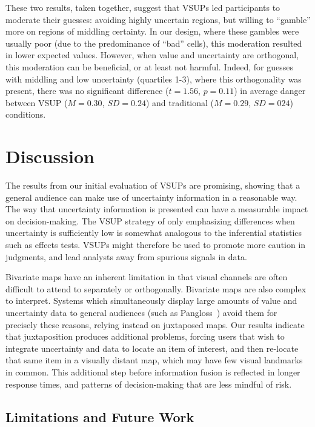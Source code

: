 These two results, taken together, suggest that VSUPs led participants to moderate their guesses: avoiding highly uncertain regions, but willing to ``gamble'' more on regions of middling certainty. In our design, where these gambles were usually poor (due to the predominance of ``bad'' cells), this moderation resulted in lower expected values. However, when value and uncertainty are orthogonal, this moderation can be beneficial, or at least not harmful. Indeed, for guesses with middling and low uncertainty (quartiles 1-3), where this orthogonality was present, there was no significant difference ($t=1.56$, $p=0.11$) in average danger between VSUP ($M=0.30$, $SD=0.24$) and traditional ($M=0.29$, $SD=024$) conditions. 

\section{Discussion}

\sizeFig

The results from our initial evaluation of VSUPs are promising, showing that a general audience can make use of uncertainty information in a reasonable way. The way that uncertainty information is presented can have a measurable impact on decision-making. The VSUP strategy of only emphasizing differences when uncertainty is sufficiently low is somewhat analogous to the inferential statistics such as effects tests. VSUPs might therefore be used to promote more caution in judgments, and lead analysts away from spurious signals in data.

Bivariate maps have an inherent limitation in that visual channels are often difficult to attend to separately or orthogonally. Bivariate maps are also complex to interpret. Systems which simultaneously display large amounts of value and uncertainty data to general audiences (such as Pangloss~\cite{moritz2017trust}) avoid them for precisely these reasons, relying instead on juxtaposed maps. Our results indicate that juxtaposition produces additional problems, forcing users that wish to integrate uncertainty and data to locate an item of interest, and then re-locate that same item in a visually distant map, which may have few visual landmarks in common. This additional step before information fusion is reflected in longer response times, and patterns of decision-making that are less mindful of risk.

\subsection{Limitations and Future Work}

